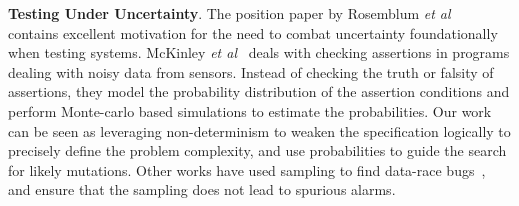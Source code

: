 \textbf{ Testing Under Uncertainty}. The position paper by Rosemblum \textit{et
al}~\cite{Elbaum:2014:KUT:2635868.2666608} contains excellent motivation for the
need to combat uncertainty foundationally when testing systems. McKinley
\textit{et al}~\cite{bornholt2014uncertain,sampson2014expressing} deals with checking
assertions in programs dealing with noisy data from sensors. Instead of checking
the truth or falsity of assertions, they model the probability distribution of
the assertion conditions and perform Monte-carlo based simulations to estimate
the probabilities. Our work can be seen as leveraging non-determinism to weaken
the specification logically to precisely define the problem complexity, and use
probabilities to guide the search for likely mutations.  Other works have used
sampling to find data-race bugs~\cite{marino2009literace}, and ensure that the
sampling does not lead to spurious alarms.
